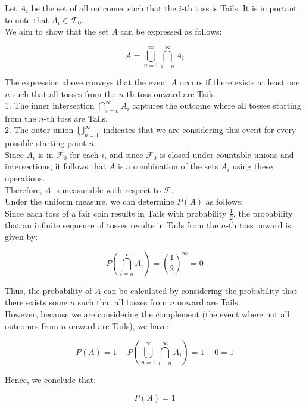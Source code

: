 \begin{solution}
    Let \( A_i \) be the set of all outcomes such that the \( i \)-th toss is Tails. It is important to note that \( A_i \in \mathcal{F}_0 \).\\
    
    We aim to show that the set \( A \) can be expressed as follows:

    \[
    A = \bigcup_{n=1}^{\infty} \bigcap_{i=n}^{\infty} A_i 
    \]
    
    
    The expression above conveys that the event \( A \) occurs if there exists at least one \( n \) such that all tosses from the \( n \)-th toss onward are Tails. \\
    
    1. The inner intersection \( \bigcap_{i=n}^{\infty} A_i \) captures the outcome where all tosses starting from the \( n \)-th toss are Tails.\\
    2. The outer union \( \bigcup_{n=1}^{\infty} \) indicates that we are considering this event for every possible starting point \( n \).\\
    
    Since \( A_i \) is in \( \mathcal{F}_0 \) for each \( i \), and since \( \mathcal{F}_0 \) is closed under countable unions and intersections, it follows that \( A \) is a combination of the sets \( A_i \) using these operations.\\
    
    Therefore, \( A \) is measurable with respect to \( \mathcal{F} \).\\
    
    Under the uniform measure, we can determine \( P(A) \) as follows:\\
    
    Since each toss of a fair coin results in Tails with probability \( \frac{1}{2} \), the probability that an infinite sequence of tosses results in Tails from the \( n \)-th toss onward is given by:
    
    \[
    P\left(\bigcap_{i=n}^{\infty} A_i\right) = \left( \frac{1}{2} \right)^{\infty} = 0
    \]
    
    Thus, the probability of \( A \) can be calculated by considering the probability that there exists some \( n \) such that all tosses from \( n \) onward are Tails. \\
    
    However, because we are considering the complement (the event where not all outcomes from \( n \) onward are Tails), we have:
    
    \[
    P(A) = 1 - P\left(\bigcup_{n=1}^{\infty} \bigcap_{i=n}^{\infty} A_i\right) = 1 - 0 = 1
    \]
    
    Hence, we conclude that:
    
    \[
    P(A) = 1
    \]
    
\end{solution}

